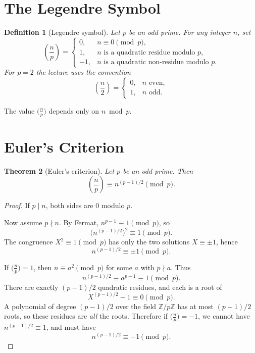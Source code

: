\documentclass[11pt]{article}
\newtheorem{theorem}{Theorem}[section]
\newtheorem{definition}[theorem]{Definition}
\theoremstyle{remark}
\newcommand{\Z}{\mathbb Z}
\begin{document}
\section{The Legendre Symbol}

\begin{definition}[Legendre symbol]
Let $p$ be an odd prime. For any integer $n$, set
\[
\left(\frac np\right)
=
\begin{cases}
0,& n\equiv 0\pmod p,\\[1mm]
1,& n\text{ is a quadratic residue modulo }p,\\[1mm]
-1,& n\text{ is a quadratic non-residue modulo }p.
\end{cases}
\]
For $p=2$ the lecture uses the convention
\[
\left(\frac n2\right)
=
\begin{cases}
0,& n\text{ even},\\[1mm]
1,& n\text{ odd}.
\end{cases}
\]
\end{definition}

The value $\bigl(\frac np\bigr)$ depends only on $n\bmod p$.

\section{Euler's Criterion}

\begin{theorem}[Euler's criterion]
Let $p$ be an odd prime. Then
\[
    \boxed{
    \left(\frac np\right)
    \equiv
    n^{(p-1)/2}
    \pmod p.
    }
\]
\end{theorem}

\begin{proof}
If $p\mid n$, both sides are $0$ modulo $p$.

Now assume $p\nmid n$. By Fermat, $n^{p-1}\equiv 1\pmod p$, so
\[
    \bigl(n^{(p-1)/2}\bigr)^2\equiv 1\pmod p.
\]
The congruence $X^2\equiv 1\pmod p$ has only the two solutions $X\equiv\pm 1$,
hence
\[
    n^{(p-1)/2}\equiv\pm 1\pmod p.
\]

If $\bigl(\frac np\bigr)=1$, then $n\equiv a^2\pmod p$ for some $a$ with
$p\nmid a$. Thus
\[
    n^{(p-1)/2}\equiv a^{p-1}\equiv 1\pmod p.
\]
There are exactly $(p-1)/2$ quadratic residues, and each is a root of
\[
    X^{(p-1)/2}-1\equiv 0\pmod p.
\]
A polynomial of degree $(p-1)/2$ over the field $\Z/p\Z$ has at most
$(p-1)/2$ roots, so these residues are \emph{all} the roots. Therefore if
$\bigl(\frac np\bigr)=-1$, we cannot have $n^{(p-1)/2}\equiv 1$, and must have
\[
    n^{(p-1)/2}\equiv -1\pmod p.
\]
\end{proof}
\end{document}
